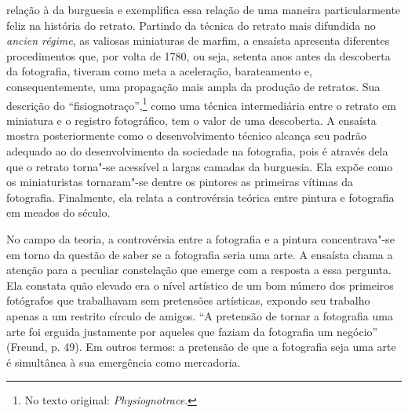 relação à da burguesia e exemplifica essa relação de uma maneira
particularmente feliz na história do retrato. Partindo da técnica do
retrato mais difundida no \emph{ancien régime}, as valiosas miniaturas
de marfim, a ensaísta apresenta diferentes procedimentos que, por volta de
1780, ou seja, setenta anos antes da descoberta da fotografia, tiveram
como meta a aceleração, barateamento e, consequentemente, uma propagação
mais ampla da produção de retratos. Sua descrição do
``fisiognotraço'',\footnote{No texto original:
  \emph{Physiognotrace}. \versal{[N.~T.]}} como uma técnica intermediária
entre o retrato em
miniatura e o registro fotográfico, tem o valor de uma descoberta. A
ensaísta mostra posteriormente como o desenvolvimento técnico alcança seu
padrão adequado ao do desenvolvimento da sociedade na fotografia, pois é através dela que o retrato torna"-se
acessível a largas camadas da burguesia. Ela expõe como os miniaturistas
tornaram"-se dentre os pintores as primeiras vítimas da fotografia.
Finalmente, ela relata a controvérsia teórica entre pintura e
fotografia em meados do século.

No campo da teoria, a controvérsia entre a fotografia e a pintura
concentrava"-se em torno da questão de saber se a fotografia seria uma arte.
A ensaísta chama a atenção para a peculiar constelação que emerge com a
resposta a essa pergunta. Ela constata quão elevado era o nível
artístico de um bom número dos primeiros fotógrafos que trabalhavam sem
pretensões artísticas, expondo seu trabalho apenas a um restrito
círculo de amigos. ``A pretensão de tornar a fotografia uma arte foi
erguida justamente por aqueles que faziam da fotografia um negócio''
(Freund, p. 49). Em outros termos: a pretensão de que a
fotografia seja uma arte é simultânea à sua emergência como mercadoria.

